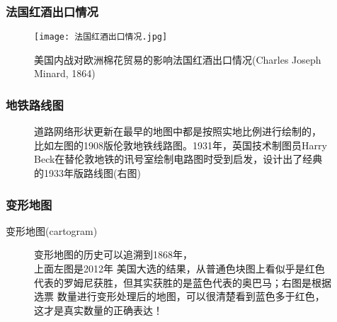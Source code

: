 \subsubsection{法国红酒出口情况}
\begin{frame}{\subsecname}{}
 \begin{figure}
   \centering \texttt{[image: 法国红酒出口情况.jpg]}
   \caption{美国内战对欧洲棉花贸易的影响法国红酒出口情况(Charles
     Joseph Minard, 1864)}
 \end{figure}
\end{frame}

\subsubsection{地铁路线图}
\begin{frame}{\subsecname}{\subsubsecname}
  \begin{figure}\centering
    \vspace{0.5pt} 
    \caption{道路网络形状更新在最早的地图中都是按照实地比例进行绘制的，
      比如左图的1908版伦敦地铁线路图。1931年，英国技术制图员Harry
      Beck在替伦敦地铁的讯号室绘制电路图时受到启发，设计出了经典
      的1933年版路线图(右图)}
  \end{figure} 
\end{frame}

\subsubsection{变形地图}
\begin{frame}{\subsecname}{变形地图(cartogram)}
  \begin{figure}\centering
    \vspace{0.5pt}
    \caption{变形地图的历史可以追溯到1868年，\\上面左图是2012年
      美国大选的结果，从普通色块图上看似乎是红色代表的罗姆尼获胜，但其实获胜的是蓝色代表的奥巴马；右图是根据选票
      数量进行变形处理后的地图，可以很清楚看到蓝色多于红色，这才是真实数量的正确表达！}
  \end{figure}
\end{frame}

